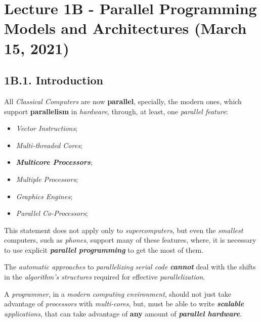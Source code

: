 \section*{\Large{\textbf{Lecture 1B - Parallel Programming Models and Architectures}} \small{(March 15, 2021)}}
\label{sec:lecture-1B}

\subsection*{\large{\textbf{1B.1. Introduction}}}
\label{ssec:lecture-1B1}

\noindent All \emph{Classical Computers} are now \textbf{parallel}, specially, the modern ones, which support \textbf{parallelism} in \emph{hardware}, through, at least, one \emph{parallel feature}:
\begin{itemize}
    \vspace{-0.1cm}
    \item \emph{Vector Instructions};
    \vspace{-0.1cm}
    \item \emph{Multi-threaded Cores};
    \vspace{-0.1cm}
    \item \textbf{\emph{Multicore Processors}};
    \vspace{-0.1cm}
    \item \emph{Multiple Processors};
    \vspace{-0.1cm}
    \item \emph{Graphics Engines};
    \vspace{-0.1cm}
    \item \emph{Parallel Co-Processors};
\end{itemize}

\noindent This statement does not apply only to \emph{supercomputers}, but even the \emph{smallest} computers, such as \emph{phones}, support many of these features, where, it is necessary to use explicit \textbf{\emph{parallel programming}} to get the most of them.

The \emph{automatic approaches} to \emph{parallelizing} \emph{serial code} \textbf{\emph{cannot}} deal with the shifts in the \emph{algorithm's structures} required for effective \emph{parallelization}.

A \emph{programmer}, in a \emph{modern computing environment}, should not just take advantage of \emph{processors} with \emph{multi-cores}, but, must be able to write \textbf{\emph{scalable}} \emph{applications}, that can take advantage of \textbf{any} amount of \textbf{\emph{parallel hardware}}.

